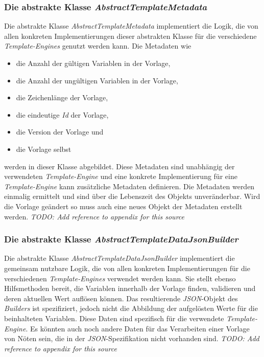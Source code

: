 \subsubsection{Die abstrakte Klasse \emph{AbstractTemplateMetadata}}
\label{sec:abstractTemplateMetadata}
Die abstrakte Klasse \emph{AbstractTemplateMetadata} implementiert die Logik, die von allen konkreten Implementierungen dieser abstrakten Klasse für die verschiedene \emph{Template-Engines} genutzt werden kann. Die Metadaten wie
\begin{itemize}
	\item die Anzahl der gültigen Variablen in der Vorlage,
	\item die Anzahl der ungültigen Variablen in der Vorlage,
	\item die Zeichenlänge der Vorlage,
	\item die eindeutige \emph{Id} der Vorlage,
	\item die Version der Vorlage und
	\item die Vorlage selbst
\end{itemize}
werden in dieser Klasse abgebildet. Diese Metadaten sind unabhängig der verwendeten \emph{Template-Engine} und eine konkrete Implementierung für eine \emph{Template-Engine} kann zusätzliche Metadaten definieren. Die Metadaten werden einmalig ermittelt und sind über die Lebenszeit des Objekts unveränderbar. Wird die Vorlage geändert so muss auch eine neues Objekt der Metadaten erstellt werden.
\newline
\newline
\emph{TODO: Add reference to appendix for this source}

\subsubsection{Die abstrakte Klasse \emph{AbstractTemplateDataJsonBuilder}}
\label{sec:abstractTemplateDataJsonBuilder}
Die abstrakte Klasse \emph{AbstractTemplateDataJsonBuilder} implementiert die gemeinsam nutzbare Logik, die von allen konkreten Implementierungen für die verschiedenen \emph{Template-Engines} verwendet werden kann. Sie stellt ebenso Hilfsmethoden bereit, die Variablen innerhalb der Vorlage finden, validieren und deren aktuellen Wert auflösen können. Das resultierende \emph{JSON}-Objekt des \emph{Builders} ist spezifiziert, jedoch nicht die Abbildung der aufgelösten Werte für die beinhalteten Variablen. Diese Daten sind spezifisch für die verwendete \emph{Template-Engine}. Es könnten auch noch andere Daten für das Verarbeiten einer Vorlage von Nöten sein, die in der \emph{JSON}-Spezifikation nicht vorhanden sind. 
\newline 
\newline  
\emph{TODO: Add reference to appendix for this source}

